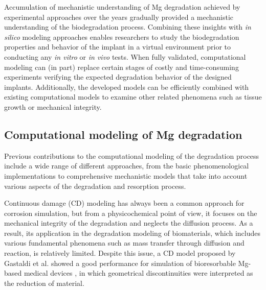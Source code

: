 Accumulation of mechanistic understanding of Mg degradation achieved by experimental approaches over the years gradually provided a mechanistic understanding of the biodegradation process. Combining these insights with \textit{in silico} modeling approaches enables researchers to study the biodegradation properties and behavior of the implant in a virtual environment prior to conducting any \textit{in vitro} or \textit{in vivo} tests. When fully validated, computational modeling can (in part) replace certain stages of costly and time-consuming experiments verifying the expected degradation behavior of the designed implants. Additionally, the developed models can be efficiently combined with existing computational models to examine  other related phenomena such as tissue growth or mechanical integrity.

\subsection{Computational modeling of Mg degradation}

Previous contributions to the computational modeling of the degradation process include a wide range of different approaches, from the basic phenomenological implementations to comprehensive mechanistic models that take into account various aspects of the degradation and resorption process.


Continuous damage ({CD}) modeling has always been a common approach for corrosion simulation, but from a physicochemical point of view, it focuses on the mechanical integrity of the degradation and neglects the diffusion process. As a result, its application in the degradation modeling of biomaterials, which includes various fundamental phenomena such as mass transfer through diffusion and reaction, is relatively limited. Despite this issue, a {CD} model proposed by Gastaldi et al. showed a good performance for simulation of bioresorbable Mg-based medical devices \cite{Gastaldi2011},
in which geometrical discontinuities were interpreted as the reduction of material.


